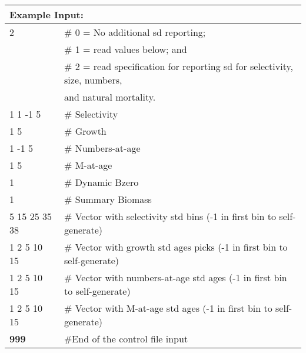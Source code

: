 \begin{longtable}{p{1.1cm} p{1.4cm} p{1.2cm} p{1.2cm} p{1.3cm} p{1.6cm} p{1.4cm} p{1.4cm} p{1.4cm}}
	
	\hline
	\multicolumn{9}{l}{Example Input:} \Tstrut\Bstrut\\
	\hline
	
	\multicolumn{3}{l}{2} & \multicolumn{6}{l}{\# 0 = No additional \gls{sd} reporting;} \Tstrut\\
	\multicolumn{3}{l}{ } & \multicolumn{6}{l}{\# 1 = read values below; and} \Bstrut\\
	\multicolumn{3}{l}{ } & \multicolumn{6}{l}{\# 2 = read specification for reporting \gls{sd} for selectivity, size, numbers,} \Bstrut\\
	\multicolumn{3}{l}{ } & \multicolumn{6}{l}{and natural mortality.} \Bstrut\\
	\hline
	
	\multicolumn{4}{l}{1 1 -1 5}  & \multicolumn{5}{l}{\# Selectivity} \Bstrut\\
	\multicolumn{4}{l}{1 5}       & \multicolumn{5}{l}{\# Growth} \Bstrut\\
	\multicolumn{4}{l}{1 -1 5}    & \multicolumn{5}{l}{\# Numbers-at-age} \Bstrut\\
	\multicolumn{4}{l}{1 5}       & \multicolumn{5}{l}{\# M-at-age} \Bstrut\\
	\multicolumn{4}{l}{1}         & \multicolumn{5}{l}{\# Dynamic Bzero} \Bstrut\\
	\multicolumn{4}{l}{1}         & \multicolumn{5}{l}{\# Summary Biomass} \Bstrut\\
	
	\multicolumn{4}{l}{5 15 25 35 38} & \multicolumn{5}{l}{\# Vector with selectivity std bins (-1 in first bin to self-generate)} \Bstrut\\
	\multicolumn{4}{l}{1 2 5 10 15}  & \multicolumn{5}{l}{\# Vector with growth std ages picks (-1 in first bin to self-generate)} \Bstrut\\
	\multicolumn{4}{l}{1 2 5 10 15}  & \multicolumn{5}{l}{\# Vector with numbers-at-age std ages (-1 in first bin to self-generate)} \Bstrut\\
	\multicolumn{4}{l}{1 2 5 10 15}  & \multicolumn{5}{l}{\# Vector with M-at-age std ages (-1 in first bin to self-generate)} \Bstrut\\
	
	\hline
	\bfseries{999} & \multicolumn{8}{l}{\#End of the control file input} \Tstrut\Bstrut\\
	\hline			
\end{longtable}

\pagebreak
